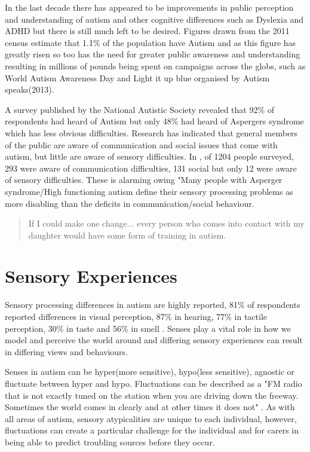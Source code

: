 \documentclass[11pt]{report}
\begin{document}
In the last decade there has appeared to be improvements in public perception and understanding of autism and other cognitive differences such as Dyslexia and ADHD but there is still much left to be desired. Figures drawn from the 2011 census estimate that 1.1\% of the population have Autism\cite{nas} and as this figure has greatly risen\cite{increasingprevalence} so too has the need for greater public awareness and understanding\cite{autism_awareness} resulting in millions of pounds being spent on campaigns across the globs, such as World Autism Awareness Day and Light it up blue organised by Autism speaks(2013)\cite{autism_awareness}. 

A survey published by the National Autistic Society revealed that 92\% of respondents had heard of Autism but only 48\% had heard of Aspergers syndrome which has less obvious difficulties. Research has indicated that general members of the public are aware of communication and social issues that come with autism\cite{autismmisconception}, but little are aware of sensory difficulties\cite{autism_awareness}. In \cite{autism_awareness}, of 1204 people surveyed, 293 were aware of communication difficulties, 131 social but only 12 were aware of sensory difficulties. These is alarming owing "Many people with Asperger syndrome/High functioning autism define their sensory processing problems as more disabling than the deficits in communication/social behaviour\cite{olgab}.

\begin{quote}
If I could make one change... every person who comes into contact with my daughter would have some form of training in autism.\cite{nasschool}
\end{quote}

\section{Sensory Experiences}
Sensory processing differences in autism are highly reported, 81\% of respondents reported differences in visual perception, 87\% in hearing, 77\% in tactile perception, 30\% in taste and 56\% in smell \cite{sensory_leisure}. Senses play a vital role in how we model and perceive the world around and differing sensory experiences can result in differing views and behaviours.
 
Senses in autism can be hyper(more sensitive), hypo(less sensitive), agnostic or fluctuate between hyper and hypo\cite{bayes}. Fluctuations can be described as a "FM radio that is not exactly tuned on the station when you are driving down the freeway. Sometimes the world comes in clearly and at other times it does not" \cite{olgab}. As with all areas of autism, sensory atypicalities are unique to each individual, however, fluctuations can create a particular challenge for the individual and for carers in being able to predict troubling sources before they occur. 
\end{document}
